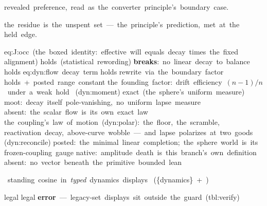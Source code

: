   { revealed~preference,~read~as~the~converter~principle's~boundary~case. }

  { the~residue~is~the~unspent~set~---~the~principle's~prediction,~met~at~the~
    held~edge. }



\PostBranchBreakage
  { eq:J:occ~(the~boxed~identity:~effective~will~equals~decay~times~the~fixed~
    alignment) }
  { holds~(statistical~rewording) }
  { \textbf{breaks}:~no~linear~decay~to~balance }
  { holds }
\PostBranchBreakage
  { eq:dyn:flow~decay~term }
  { holds }
  { rewrite~via~the~boundary~factor }
  { holds~+~posted~range~constant }
\PostBranchBreakage
  { the~founding~factor:~drift~efficiency~$(n-1)/n$~under~a~weak~hold~
    (dyn:moment) }
  { exact~(the~sphere's~uniform~measure) }
  { moot:~decay~itself~pole-vanishing,~no~uniform~lapse~measure }
  { absent:~the~scalar~flow~is~its~own~exact~law }
\PostBranchBreakage
  { the~coupling's~law~of~motion~(dyn:polar):~the~floor,~the~scramble,~
    reactivation~decay,~above-curve~wobble~---~and~lapse~polarizes~at~two~goods~
    (dyn:reconcile) }
  { posted:~the~minimal~linear~completion;~the~sphere~world~is~its~
    frozen-coupling~gauge }
  { native:~amplitude~death~is~this~branch's~own~definition }
  { absent:~no~vector~beneath~the~primitive~bounded~lean }
\PostBranchBreakage
  { \raggedright{}~standing~cosine~in~\emph{typed}~dynamics~displays~
    (\string\DisplayClass\allowbreak\{dynamics\}~+~\string\alignstand) }
  { legal }
  { legal }
  { \textbf{error}~---~legacy-set~displays~sit~outside~the~guard~(tbl:verify) }
